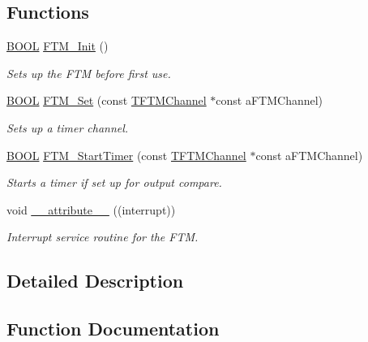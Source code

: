 \subsection*{Functions}
\begin{DoxyCompactItemize}
\item 
\hyperlink{types_8h_a3e5b8192e7d9ffaf3542f1210aec18dd}{B\+O\+O\+L} \hyperlink{group___timer__module_ga3687c17e07a3faa0cf0cbec2a6639b74}{F\+T\+M\+\_\+\+Init} ()
\begin{DoxyCompactList}\small\item\em Sets up the F\+T\+M before first use. \end{DoxyCompactList}\item 
\hyperlink{types_8h_a3e5b8192e7d9ffaf3542f1210aec18dd}{B\+O\+O\+L} \hyperlink{group___timer__module_gac8d7110bd0a928b78407114222dc279b}{F\+T\+M\+\_\+\+Set} (const \hyperlink{struct_t_f_t_m_channel}{T\+F\+T\+M\+Channel} $\ast$const a\+F\+T\+M\+Channel)
\begin{DoxyCompactList}\small\item\em Sets up a timer channel. \end{DoxyCompactList}\item 
\hyperlink{types_8h_a3e5b8192e7d9ffaf3542f1210aec18dd}{B\+O\+O\+L} \hyperlink{group___timer__module_gafadfa05ab10215491e093bb886c0e389}{F\+T\+M\+\_\+\+Start\+Timer} (const \hyperlink{struct_t_f_t_m_channel}{T\+F\+T\+M\+Channel} $\ast$const a\+F\+T\+M\+Channel)
\begin{DoxyCompactList}\small\item\em Starts a timer if set up for output compare. \end{DoxyCompactList}\item 
void \hyperlink{group___timer__module_ga445500277ba0e363873b34cffc015745}{\+\_\+\+\_\+attribute\+\_\+\+\_\+} ((interrupt))
\begin{DoxyCompactList}\small\item\em Interrupt service routine for the F\+T\+M. \end{DoxyCompactList}\end{DoxyCompactItemize}


\subsection{Detailed Description}


\subsection{Function Documentation}
\hypertarget{group___timer__module_ga445500277ba0e363873b34cffc015745}{}
